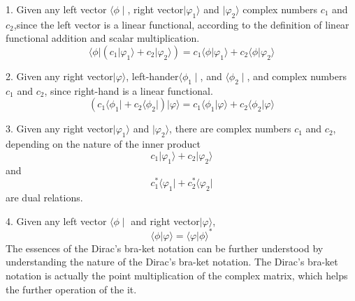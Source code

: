 \documentclass[a4paper]{article}
\begin{document}
1.  Given any left vector $\langle\phi\mid$, right vector$\mid\varphi_1\rangle$ and $\mid\varphi_2\rangle$ complex numbers $c_1$ and $c_2$,since the left vector is a linear functional, according to the definition of linear functional addition and scalar multiplication.
\begin{equation}   
\textbf{$\langle\phi\vert(c_1\vert\varphi_1\rangle+c_2\vert\varphi_2\rangle)$}=
\textbf{$c_1\langle\phi\vert\varphi_1\rangle+c_2\langle\phi\vert\varphi_2\rangle$}
\end{equation}

2.  Given any right vector$\mid\varphi\rangle$, left-hander$\langle\phi_1\mid$, and $\langle\phi_2\mid$, and complex numbers $c_1$ and $c_2$, since right-hand is a linear functional.
\begin{equation}   
\textbf{$(c_1\langle\phi_1\vert+c_2\langle\phi_2\vert)\vert\varphi\rangle$}=
\textbf{$c_1\langle\phi_1\vert\varphi\rangle+c_2\langle\phi_2\vert\varphi\rangle$}
\end{equation}

3.  Given any right vector$\mid\varphi_1\rangle$ and $\mid\varphi_2\rangle$, there are complex numbers $c_1$ and $c_2$, depending on the nature of the inner product
\begin{equation}   
\textbf{$c_1\vert\varphi_1\rangle+c_2\vert\varphi_2\rangle$}
\end{equation}
and
\begin{equation}   
\textbf{$c_1^*\langle\varphi_1\vert+c_2^*\langle\varphi_2\vert$}
\end{equation}
are dual relations.

4.  Given any left vector $\langle\phi\mid$ and right vector$\mid\varphi\rangle$, 
\begin{equation}   
\textbf{$\langle\phi\vert\varphi\rangle$}=
\textbf{$\langle\varphi\vert\phi\rangle^*$}
\end{equation}
    The essences of the Dirac's bra-ket notation can be further understood by understanding the nature of the Dirac's bra-ket notation. The Dirac's bra-ket notation is actually the point multiplication of the complex matrix, which helps the further operation of the it.
\end{document}
